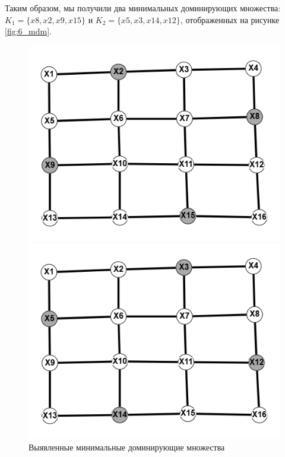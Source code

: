 \documentclass{article}
\begin{document}
\begin{enumerate}
Таким образом, мы получили два минимальных доминирующих множества: $K_1 = \{x8, x2, x9, x15\}$ и $K_2 = \{x5, x3, x14, x12\}$, отображенных на рисунке \ref{fig:6_mdm}.
\begin{figure}[ht]
  \begin{minipage}[b]{.5\linewidth}
    \centering
    \includegraphics[width=\textwidth, center]{attachments/6/0.png}
  \end{minipage}
  \hfill
  \begin{minipage}[b]{.5\linewidth}
    \centering
    \includegraphics[width=\textwidth, center]{attachments/6/1.png}
  \end{minipage}
  \caption{Выявленные минимальные доминирующие множества}

\end{figure}
\end{enumerate}
\end{document}
